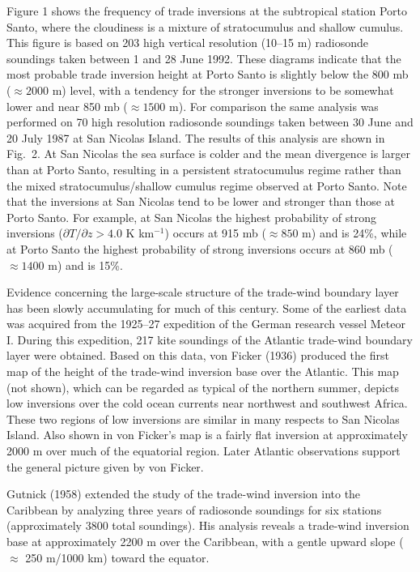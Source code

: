 Figure 1 shows the frequency of trade inversions at the subtropical 
station Porto Santo, where the cloudiness is a mixture of stratocumulus and shallow
cumulus. This
figure is based on 203 high vertical resolution (10--15 m) radiosonde
soundings taken between 1 and 28 June 1992.  
These diagrams indicate that the
most probable trade inversion height at Porto Santo is slightly below the 800
mb ($\approx 2000$ m)  level, with a tendency for the stronger inversions to
be somewhat lower and near 850 mb ($\approx 1500$ m).
For comparison the same analysis was performed on 70 high resolution
radiosonde soundings taken between 30 June and 20 July 1987 at 
San Nicolas Island.  The results of
this analysis are shown in Fig.~2.  At San Nicolas the sea surface is colder
and the mean divergence is larger than at Porto Santo, resulting in a
persistent stratocumulus regime rather than the mixed stratocumulus/shallow
cumulus regime observed at Porto Santo.  Note that the inversions at San
Nicolas tend to be lower and stronger than those at Porto Santo.  For example,
at San Nicolas the highest probability of strong inversions
($\partial T/\partial z > 4.0$ K km$^{-1}$) occurs at 915 mb ($\approx 850$ m)
and is 24\%, while at Porto Santo the highest probability of strong inversions
occurs at 860 mb ($\approx 1400$ m) and is 15\%.

     Evidence concerning the large-scale structure of the trade-wind boundary
layer has been slowly accumulating for much of this century.  Some of the
earliest data was acquired from the 1925--27 expedition of the German research
vessel Meteor I.  During this expedition, 217 kite soundings of the Atlantic
trade-wind boundary layer were obtained.  Based on this data, von Ficker
(1936) produced the first map of the height of the trade-wind inversion base
over the Atlantic.  This map (not shown), which can be regarded as typical of the
northern summer, depicts low inversions over the cold ocean currents near
northwest and southwest Africa.  These two regions of low inversions are
similar in many respects to San Nicolas Island.  Also shown in von Ficker's map
is a fairly
flat inversion at approximately 2000 m over much of the equatorial region.
Later Atlantic observations support the general picture given by von Ficker.

     Gutnick (1958) extended the study of the trade-wind inversion into the
Caribbean by analyzing three years of radiosonde soundings for six stations
(approximately 3800 total soundings). His analysis reveals a trade-wind inversion base at
approximately 2200 m over the Caribbean, with a gentle upward slope
($\approx$ 250 m/1000 km) toward the equator.

